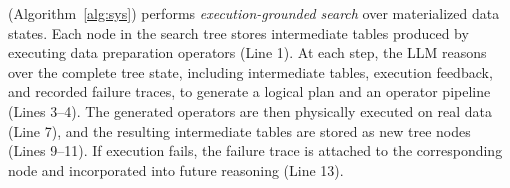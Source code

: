 %
%

%
\sys (Algorithm~\ref{alg:sys}) performs \emph{execution-grounded search} over materialized data states. Each node in the search tree stores intermediate tables produced by executing data preparation operators (Line 1). At each step, the LLM reasons over the complete tree state, including intermediate tables, execution feedback, and recorded failure traces, to generate a logical plan and an operator pipeline (Lines 3--4). The generated operators are then physically executed on real data (Line 7), and the resulting intermediate tables are stored as new tree nodes (Lines 9--11). If execution fails, the failure trace is attached to the corresponding node and incorporated into future reasoning (Line 13).

